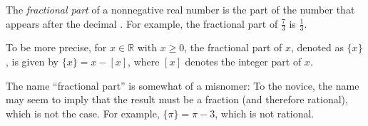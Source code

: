 \documentclass[12pt]{article}
\begin{document}
The \emph{fractional part} of a nonnegative real number is the part of the number that appears after the decimal .  For example, the fractional part of $\frac{7}{3}$ is $\frac{1}{3}$.

To be more precise, for $x \in \mathbb{R}$ with $x \ge 0$, the fractional part of $x$, denoted as $\{x\}$, is given by $\{x\}=x-[x]$, where $[x]$ denotes the integer part of $x$.

The name ``fractional part'' is somewhat of a misnomer:  To the novice, the name may seem to imply that the result must be a fraction (and therefore rational), which is not the case.  For example, $\{\pi\}=\pi-3$, which is not rational.
\end{document}
